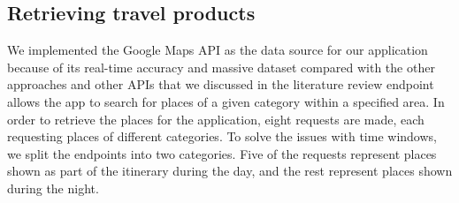 \subsection{Retrieving travel products}

We implemented the Google Maps API as the data source for our application
because of its real-time accuracy and massive dataset compared with the other
approaches and other APIs that we discussed in the literature review
endpoint allows the app to search
for places of a given category within a specified area. In order to retrieve
the places for the application, eight requests are made, each requesting places
of different categories. To solve the issues with time windows, we split the
endpoints into two categories. Five of the requests represent places shown as
part of the itinerary during the day, and the rest represent places shown
during the night. 





